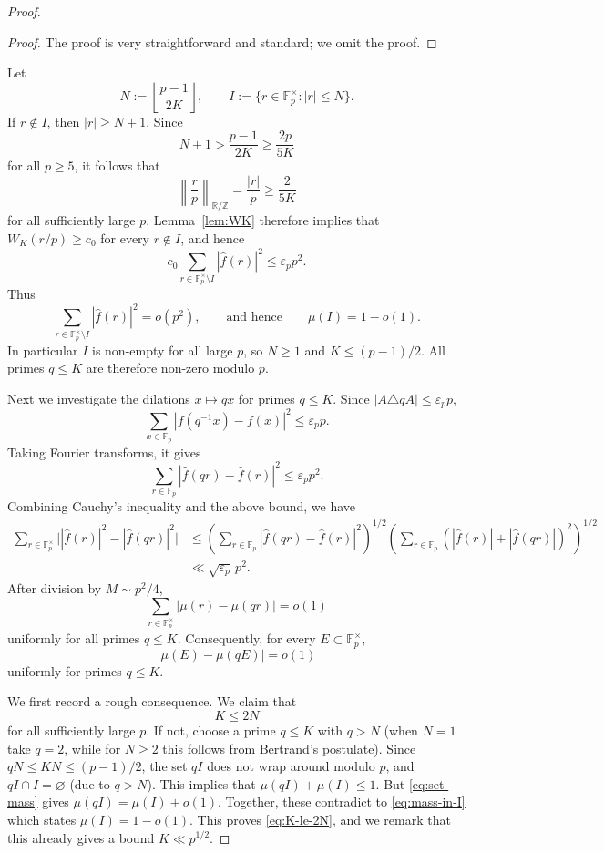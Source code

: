 \documentclass[11pt,letterpaper,reqno]{amsart}
\theoremstyle{definition}
\newcommand{\F}{\mathbb F}
\newcommand{\Z}{\mathbb Z}
\newcommand{\R}{\mathbb R}
\newcommand{\1}{\mathbf 1}
\newcommand{\eps}{\varepsilon}
\begin{document}
\begin{proof}
\begin{proof}
The proof is very straightforward and standard; we omit the proof. 
\end{proof}

Let
\[
        N:=\left\lfloor\frac{p-1}{2K}\right\rfloor,
        \qquad
        I:=\{r\in\F_p^\times: |r|\le N\}.
\]
If $r\notin I$, then $|r|\ge N+1$.  Since
\[
        N+1>\frac{p-1}{2K}\ge \frac{2p}{5K}
\]
for all $p\ge5$, it follows that
\[
        \left\|\frac rp\right\|_{\R/\Z}
        =\frac{|r|}{p}\ge \frac{2}{5K}
\]
for all sufficiently large $p$.  Lemma~\ref{lem:WK} therefore implies that
\(W_K(r/p)\ge c_0\) for every \(r\notin I\), and hence
\[
    c_0\sum_{r\in\F_p^\times\setminus I}|\widehat f(r)|^2\le \eps_p p^2.
\]
Thus
\[
    \sum_{r\in\F_p^\times\setminus I}|\widehat f(r)|^2=o(p^2),
    \qquad\text{and hence}\qquad
    \mu(I)=1-o(1).                         \tag{2.1}\label{eq:mass-in-I}
\]
In particular $I$ is non-empty for all large $p$, so $N\ge1$ and $K\le(p-1)/2$.
All primes $q\le K$ are therefore non-zero modulo $p$.

\bigskip 


Next we investigate the dilations $x\mapsto qx$ for primes $q\le K$.  Since
$|A\triangle qA|\le\eps_p p$,
\[
    \sum_{x\in\F_p}|f(q^{-1}x)-f(x)|^2\le \eps_p p.
\]
Taking Fourier transforms, it gives
\[
    \sum_{r\in\F_p}|\widehat f(qr)-\widehat f(r)|^2\le \eps_p p^2.
\]
Combining Cauchy's inequality and the above bound, we have
\[
\begin{aligned}
    \sum_{r\in\F_p^\times}\Big| |\widehat f(r)|^2  -|\widehat f(qr)|^2\Big|
    &\le
    \left(\sum_{r\in\F_p}|\widehat f(qr)-\widehat f(r)|^2\right)^{1/2}
    \left(\sum_{r\in\F_p}(|\widehat f(r)|+|\widehat f(qr)|)^2\right)^{1/2}  \\
    &\ll \sqrt{\eps_p}\,p^2.
\end{aligned}
\]
After division by $M\sim p^2/4$,
\[
    \sum_{r\in\F_p^\times}|\mu(r)-\mu(qr)|=o(1)              \tag{2.2}\label{eq:mu-inv}
\]
uniformly for all primes $q\le K$.  Consequently, for every
$E\subset\F_p^\times$,
\[
        |\mu(E)-\mu(qE)|=o(1)                         \tag{2.3}\label{eq:set-mass}
\]
uniformly for primes $q\le K$.

We first record a rough consequence.  We claim that
\[
        K\le 2N                                                   \tag{2.4}\label{eq:K-le-2N}
\]
for all sufficiently large $p$.  If not, choose a prime $q\le K$ with $q>N$ (when $N=1$ take $q=2$, while for $N\ge2$ this follows from Bertrand's postulate).
Since $qN\le KN\le(p-1)/2$, the set $qI$ does not wrap around modulo $p$, and
$qI\cap I=\varnothing$ (due to $q>N$). This implies that $\mu(qI) +\mu(I)\le 1$. But \eqref{eq:set-mass} gives
$\mu(qI)=\mu(I)+o(1)$. Together, these contradict to \eqref{eq:mass-in-I} which states $\mu(I)=1-o(1)$. This proves
\eqref{eq:K-le-2N}, and we remark that this already gives a bound $K\ll p^{1/2}$.


\end{proof}
\end{document}
